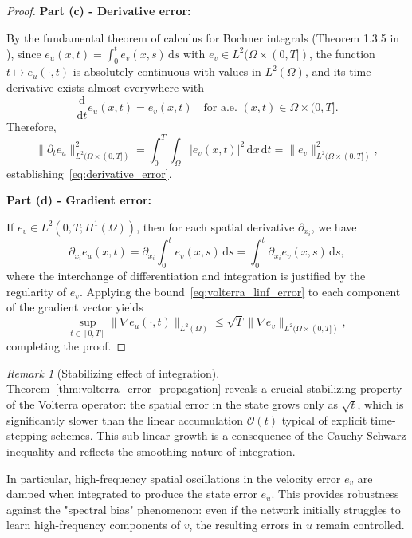 \documentclass[11pt,reqno]{amsart}
\theoremstyle{plain}
\theoremstyle{definition}
\theoremstyle{remark}
\newtheorem{remark}[theorem]{Remark}
\begin{document}
\begin{proof}
\medskip
\noindent\textbf{Part (c) - Derivative error:}

\noindent By the fundamental theorem of calculus for Bochner integrals (Theorem 1.3.5 in \cite{brezis2011}), since $\displaystyle e_u(x,t) = \int_0^t e_v(x,s) \, \mathrm{d}s$ with $e_v \in L^2(\Omega \times (0,T])$, the function $t \mapsto e_u(\cdot,t)$ is absolutely continuous with values in $L^2(\Omega)$, and its time derivative exists almost everywhere with
\begin{equation}
    \frac{\mathrm{d}}{\mathrm{d}t} e_u(x,t) = e_v(x,t) \quad \text{for a.e. } (x,t) \in \Omega \times (0,T].
\end{equation}
Therefore,
\begin{equation}
    \|\partial_t e_u\|_{L^2(\Omega \times (0,T])}^2 = \int_0^T \int_\Omega |e_v(x,t)|^2 \, \mathrm{d}x \, \mathrm{d}t = \|e_v\|_{L^2(\Omega \times (0,T])}^2,
\end{equation}
establishing~\eqref{eq:derivative_error}.

\medskip
\noindent\textbf{Part (d) - Gradient error:}

\noindent If $e_v \in L^2(0,T; H^1(\Omega))$, then for each spatial derivative $\partial_{x_i}$, we have
\begin{equation}
    \partial_{x_i} e_u(x,t) = \partial_{x_i} \int_0^t e_v(x,s) \, \mathrm{d}s = \int_0^t \partial_{x_i} e_v(x,s) \, \mathrm{d}s,
\end{equation}
where the interchange of differentiation and integration is justified by the regularity of $e_v$. Applying the bound~\eqref{eq:volterra_linf_error} to each component of the gradient vector yields
\begin{equation}
    \sup_{t \in [0,T]} \|\nabla e_u(\cdot, t)\|_{L^2(\Omega)} \leq \sqrt{T} \|\nabla e_v\|_{L^2(\Omega \times (0,T])},
\end{equation}
completing the proof.
\end{proof}

\begin{remark}[Stabilizing effect of integration]
Theorem~\ref{thm:volterra_error_propagation} reveals a crucial stabilizing property of the Volterra operator: the spatial error in the state grows only as $\sqrt{t}$, which is significantly slower than the linear accumulation $\mathcal{O}(t)$ typical of explicit time-stepping schemes. This sub-linear growth is a consequence of the Cauchy-Schwarz inequality and reflects the smoothing nature of integration. 

In particular, high-frequency spatial oscillations in the velocity error $e_v$ are damped when integrated to produce the state error $e_u$. This provides robustness against the "spectral bias" phenomenon: even if the network initially struggles to learn high-frequency components of $v$, the resulting errors in $u$ remain controlled.
\end{remark}
\end{document}

